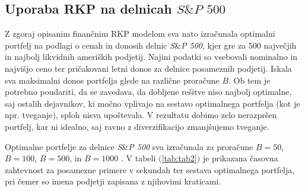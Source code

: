 \documentclass[a4paper,12pt]{article}
\theoremstyle{definition}
\begin{document}
\subsection{Uporaba RKP na delnicah $S\&P$ $500$}
Z zgoraj opisanim finančnim RKP modelom sva nato izračunala optimalni portfelj na podlagi 
o cenah in donosih delnic \textit{S}\&\textit{P 500}, kjer gre za 500 največjih in najbolj likvidnih
ameriških podjetij.  Najini 
podatki so vsebovali nominalno in najvišjo ceno ter pričakovani letni donos za delnice posameznih podjetij.
Iskala sva maksimalni donos portfelja glede na različne proračune $B$.
Ob tem je potrebno poudariti, da se zavedava, da dobljene rešitve niso najbolj optimalne, saj
ostalih dejavnikov, ki močno vplivajo na sestavo optimalnega portfelja (kot je npr. tveganje), 
sploh nisva upoštevala. V rezultatu dobimo zelo nerazpršen portfelj,
kar ni idealno, saj ravno z diverzifikacijo zmanjšujemo tveganje. 
\par
Optimalne portfelje za delnice \textit{S}\&\textit{P 500} sva izračunala za proračune $B = 50$, $B = 100$, $B = 500$,
in $B = 1000$ . V tabeli $($\ref{tab:tab2}$)$ je prikazana časovna zahtevnost za posamezne 
primere v sekundah ter sestava optimalnega portfelja, pri čemer so imena podjetji zapisana z njihovimi
kraticami. 
\end{document}
